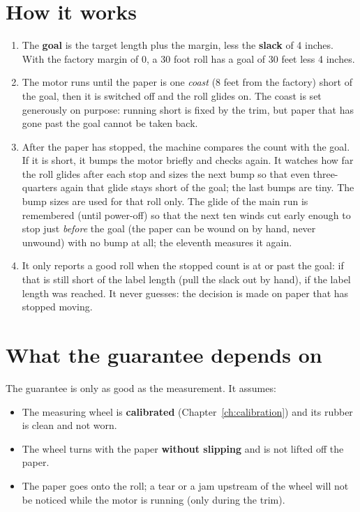 \section{How it works}
\begin{enumerate}
  \item The \textbf{goal} is the target length plus the margin, less the
        \textbf{slack} of 4 inches. With the factory margin of 0, a 30 foot
        roll has a goal of 30 feet less 4 inches.
  \item The motor runs until the paper is one \emph{coast} (8 feet from the
        factory) short of the goal, then it is switched off and the roll glides
        on. The coast is set generously on purpose: running short is fixed by
        the trim, but paper that has gone past the goal cannot be taken back.
  \item After the paper has stopped, the machine compares the count with the
        goal. If it is short, it bumps the motor briefly and checks again. It
        watches how far the roll glides after each stop and sizes the next
        bump so that even three-quarters again that glide stays short of the goal; the last
        bumps are tiny. The bump sizes are used for that roll only. The glide
        of the main run is remembered (until power-off) so that the next ten
        winds cut early enough to stop just \emph{before} the goal (the paper
        can be wound on by hand, never unwound) with no bump at all;
        the eleventh measures it again.
  \item It only reports a good roll when the stopped count is at or past the
        goal:  if that is still short of the label
        length (pull the slack out by hand),  if the label length
        was reached. It never guesses: the decision is made on paper that has stopped
        moving.
\end{enumerate}

\section{What the guarantee depends on}
The guarantee is only as good as the measurement. It assumes:
\begin{itemize}
  \item The measuring wheel is \textbf{calibrated} (Chapter~\ref{ch:calibration})
        and its rubber is clean and not worn.
  \item The wheel turns with the paper \textbf{without slipping} and is not
        lifted off the paper.
  \item The paper goes onto the roll; a tear or a jam upstream of the wheel
        will not be noticed while the motor is running (only during the trim).
\end{itemize}

